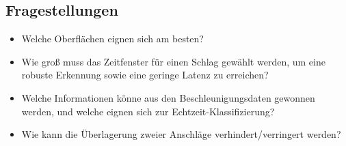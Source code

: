 \subsection*{Fragestellungen}
\begin{itemize}
	\item Welche Oberflächen eignen sich am besten?
	\item Wie groß muss das Zeitfenster für einen Schlag gewählt werden, um eine robuste Erkennung sowie eine geringe Latenz zu erreichen?
	\item Welche Informationen könne aus den Beschleunigungsdaten gewonnen werden, und welche eignen sich zur Echtzeit-Klassifizierung?
	\item Wie kann die Überlagerung zweier Anschläge verhindert/verringert werden?
\end{itemize}